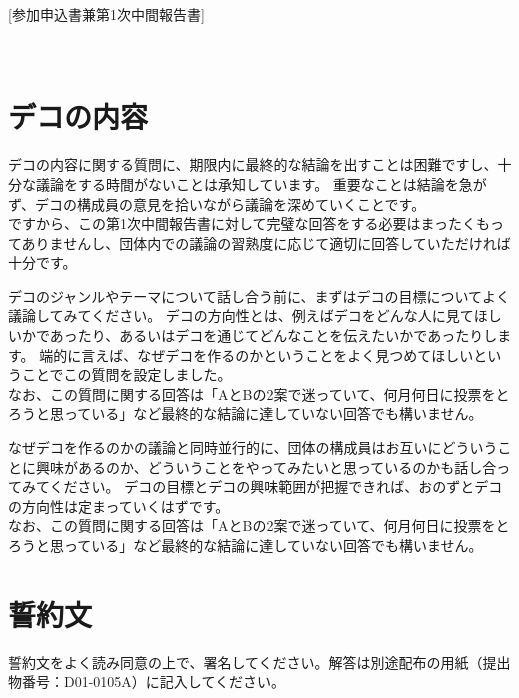 \newpage
\pagestyle{booklet}
[参加申込書兼第1次中間報告書]

\begin{multicols*}{2}
　\\
\vspace{-15mm}
\section{デコの内容}
\indent デコの内容に関する質問に、期限内に最終的な結論を出すことは困難ですし、十分な議論をする時間がないことは承知しています。
重要なことは結論を急がず、デコの構成員の意見を拾いながら議論を深めていくことです。\\
\indent ですから、この第1次中間報告書に対して完璧な回答をする必要はまったくもってありませんし、団体内での議論の習熟度に応じて適切に回答していただければ十分です。

\indent デコのジャンルやテーマについて話し合う前に、まずはデコの目標についてよく議論してみてください。
デコの方向性とは、例えばデコをどんな人に見てほしいかであったり、あるいはデコを通じてどんなことを伝えたいかであったりします。
端的に言えば、なぜデコを作るのかということをよく見つめてほしいということでこの質問を設定しました。\\
\indent なお、この質問に関する回答は「AとBの2案で迷っていて、何月何日に投票をとろうと思っている」など最終的な結論に達していない回答でも構いません。

\indent なぜデコを作るのかの議論と同時並行的に、団体の構成員はお互いにどういうことに興味があるのか、どういうことをやってみたいと思っているのかも話し合ってみてください。
デコの目標とデコの興味範囲が把握できれば、おのずとデコの方向性は定まっていくはずです。\\
\indent なお、この質問に関する回答は「AとBの2案で迷っていて、何月何日に投票をとろうと思っている」など最終的な結論に達していない回答でも構いません。


\section{誓約文}
\indent 誓約文をよく読み同意の上で、署名してください。解答は別途配布の用紙（提出物番号：D01-0105A）に記入してください。

\end{multicols*}